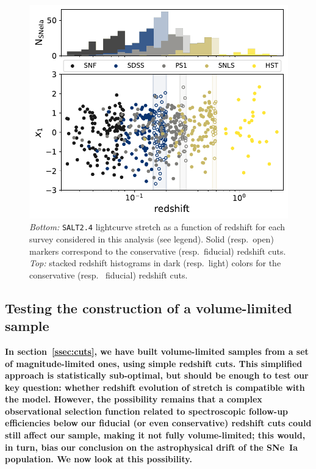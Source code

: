 \documentclass[]{aa}
\begin{document}
\begin{figure}
    \centering
    \includegraphics[width=0.95\linewidth]{Article_figures/stretchs-cut_btw_hist_stac_75-lb-cividis.pdf}
    \caption{\textit{Bottom:} \textsc{\texttt{SALT2.4}} lightcurve stretch as a
        function of redshift for each survey considered in this analysis (see
        legend). Solid (resp.\ open) markers correspond to the conservative
        (resp.\ fiducial) redshift cuts. \textit{Top:} stacked redshift
    histograms in dark (resp.\ light) colors for the conservative (resp. \
fiducial) redshift cuts.}
    \label{fig:sample}
\end{figure}

\subsection{Testing the construction of a volume-limited sample}\label{ssec:verify}

\textbf{In section~\ref{ssec:cuts}, we have built volume-limited samples from a
    set of magnitude-limited ones, using simple redshift cuts. This simplified
    approach is statistically sub-optimal, but should be enough to test our key
    question: whether redshift evolution of stretch is compatible with the
    \cite{rigault2020} model. However, the possibility remains that a complex
    observational selection function related to spectroscopic follow-up
    efficiencies below our fiducial (or even conservative) redshift cuts could
still affect our sample, making it not fully volume-limited; this would, in
turn, bias our conclusion on the astrophysical drift of the SNe~Ia population.
We now look at this possibility.}
\end{document}
